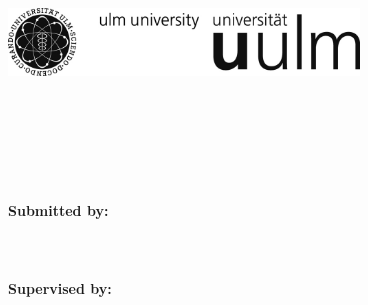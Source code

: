 \thispagestyle{empty}

\begin{titlepage}
  \sffamily
  \raggedright

  \hfill
  \includegraphics[height=1.8cm]{unilogo_sw.jpg}\\[2em]

  {\footnotesize
    \hspace*{115mm}
    \parbox[t]{35mm}{
      \bfseries \faculty\\

      \mdseries \institute
    }\\[2cm]
  
    \parbox{140mm}{\bfseries \LARGE \titleOfWork}\\[2.5em]
    {\bfseries \LARGE \subjectOfWork}\\[4em]

    {\footnotesize \bfseries Submitted by:}\\
    {\footnotesize \authorName\\ \authorEmail \\ \matrikelnummer} \\[2em]

    {\footnotesize \bfseries Supervised by:}\\
    {\footnotesize \supervisor}\\[2em]
  }
  
\end{titlepage}
  

